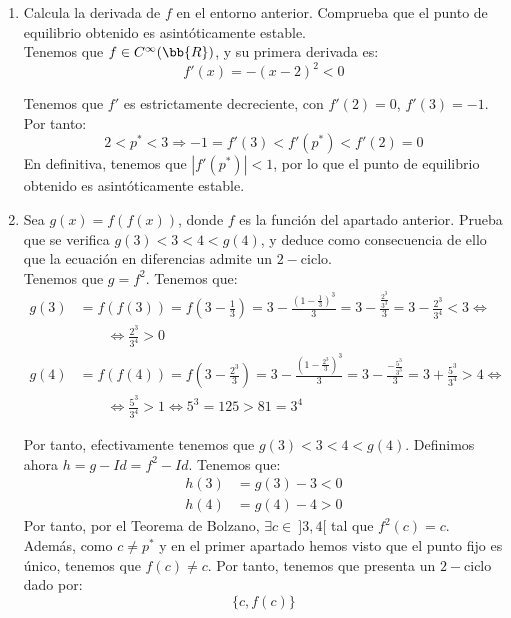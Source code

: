 \begin{ejercicio}
\begin{enumerate}
        \item Calcula la derivada de $f$ en el entorno anterior. Comprueba que el punto de equilibrio obtenido es asintóticamente estable.\\

        Tenemos que $f\in C^\infty(\bb{R})$, y su primera derivada es:
        \begin{equation*}
            f'(x) = -(x-2)^2 < 0
        \end{equation*}

        Tenemos que $f'$ es estrictamente decreciente, con $f'(2)=0$, $f'(3)=-1$. Por tanto:
        \begin{equation*}
            2 < p^\ast < 3 \Longrightarrow -1 = f'(3) < f'(p^\ast) < f'(2) = 0
        \end{equation*}
        En definitiva, tenemos que $|f'(p^\ast)|<1$, por lo que el punto de equilibrio obtenido es asintóticamente estable.
        
        \item Sea $g(x) = f(f(x))$, donde $f$ es la función del apartado anterior. Prueba que se verifica $g(3) < 3 < 4 < g(4)$, y deduce como consecuencia de ello que la ecuación en diferencias admite un $2-$ciclo.\\

        Tenemos que $g=f^2$. Tenemos que:
        \begin{align*}
            g(3) &= f(f(3)) = f\left(3-\frac{1}{3}\right)
            = 3 - \frac{\left(1-\frac{1}{3}\right)^3}{3}
            = 3 - \frac{\frac{2^3}{3^3}}{3}
            = 3 - \frac{2^3}{3^4} < 3\Longleftrightarrow
            \\ &\qquad \Longleftrightarrow \frac{2^3}{3^4}>0\\
            g(4) &= f(f(4)) = f\left(3-\frac{2^3}{3}\right)
            = 3 - \frac{\left(1-\frac{2^3}{3}\right)^3}{3}
            = 3 - \frac{-\frac{5^3}{3^3}}{3}
            = 3 + \frac{5^3}{3^4} > 4 \Longleftrightarrow
            \\ &\qquad \Longleftrightarrow \frac{5^3}{3^4} > 1 \Longleftrightarrow 5^3 = 125 > 81 = 3^4
        \end{align*}

        Por tanto, efectivamente tenemos que $g(3)<3<4<g(4)$. Definimos ahora $h=g-Id = f^2-Id$. Tenemos que:
        \begin{align*}
            h(3) &= g(3)-3 < 0\\
            h(4) &= g(4)-4 > 0
        \end{align*}
        Por tanto, por el Teorema de Bolzano, $\exists c\in ~]3,4[$ tal que $f^2(c)=c$. Además, como $c\neq p^\ast$ y en el primer apartado hemos visto que el punto fijo es único, tenemos que $f(c)\neq c$. Por tanto, tenemos que presenta un $2-$ciclo dado por:
        \begin{equation*}
            \{c, f(c)\}
        \end{equation*}
        

\end{enumerate}
\end{ejercicio}
